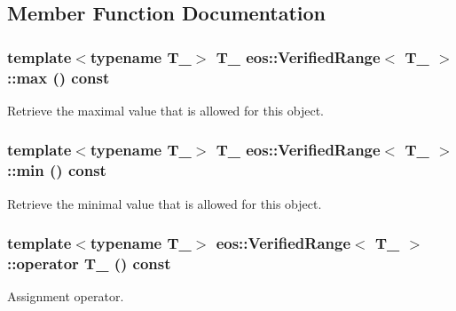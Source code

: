\subsection{Member Function Documentation}
\hypertarget{classeos_1_1VerifiedRange_a19b21c28c1afa78ce4fc83bd9cf8f866}{
\subsubsection[{max}]{\setlength{\rightskip}{0pt plus 5cm}template$<$typename T\_\-$>$ T\_\- {\bf eos::VerifiedRange}$<$ T\_\- $>$::max () const}}
\label{classeos_1_1VerifiedRange_a19b21c28c1afa78ce4fc83bd9cf8f866}


Retrieve the maximal value that is allowed for this object. \hypertarget{classeos_1_1VerifiedRange_ac2ac9a7194ece299633bfef72fb08378}{
\subsubsection[{min}]{\setlength{\rightskip}{0pt plus 5cm}template$<$typename T\_\-$>$ T\_\- {\bf eos::VerifiedRange}$<$ T\_\- $>$::min () const}}
\label{classeos_1_1VerifiedRange_ac2ac9a7194ece299633bfef72fb08378}


Retrieve the minimal value that is allowed for this object. \hypertarget{classeos_1_1VerifiedRange_aee4661f7688177fd52164d7413f9968d}{
\subsubsection[{operator T\_\-}]{\setlength{\rightskip}{0pt plus 5cm}template$<$typename T\_\-$>$ {\bf eos::VerifiedRange}$<$ T\_\- $>$::operator T\_\- () const}}
\label{classeos_1_1VerifiedRange_aee4661f7688177fd52164d7413f9968d}
Assignment operator.


